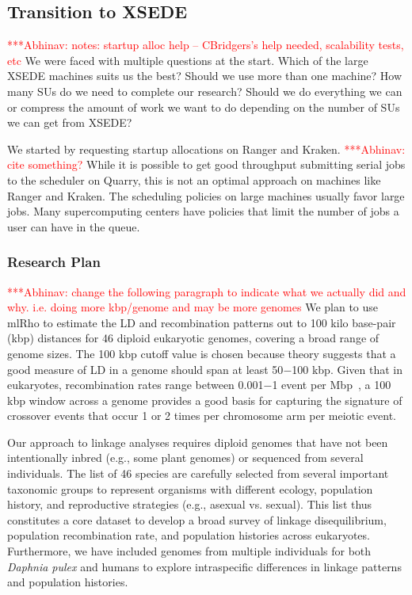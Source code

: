 \documentclass{sig-alternate}
\newcommand{\abhi}[1]{ {\textcolor{red} { ***Abhinav: #1 }}}
\newcommand{\abhi}[1]{ {}}
\begin{document}
\subsection{Transition to XSEDE}
\abhi{notes: startup alloc help -- CBridgers's help needed, scalability tests, etc}
We were faced with multiple questions at the start. Which of the large XSEDE machines suits us the best? Should we use more than one machine? How many SUs do we need to complete our research? Should we do everything we can or compress the amount of work we want to do depending on the number of SUs we can get from XSEDE?

We started by requesting startup allocations on Ranger and Kraken.  \abhi{cite something?} While it is possible to get good throughput submitting serial jobs to the scheduler on Quarry, this is not an optimal approach on machines like Ranger and Kraken. The scheduling policies on large machines usually favor large jobs. Many supercomputing centers have policies that limit the number of jobs a user can have in the queue. 


\subsubsection{Research Plan}\label{sec:plan}

\abhi{change the following paragraph to indicate what we actually did and why. i.e. doing more kbp/genome and may be more genomes}
We plan to use mlRho to estimate the LD and recombination patterns out to 100 kilo base-pair (kbp) distances for 46 diploid eukaryotic genomes, covering a broad range of genome sizes.%
The 100 kbp cutoff value is chosen because theory suggests that a good measure
of LD in a genome should span at least 50$-$100 kbp. Given that in eukaryotes, recombination rates range
between 0.001$-$1 event per Mbp~\cite{annurev-genom-082410-101412}, a 100 kbp window across a genome provides
a good basis for capturing the signature of crossover events that occur 1 or 2 times per chromosome arm per
meiotic event.

Our approach to linkage analyses requires diploid genomes that have not been intentionally inbred  (e.g., some plant genomes) or sequenced from several individuals. The list of 46 species are carefully selected from several important taxonomic groups to represent organisms with different ecology, population history, and reproductive strategies  (e.g., asexual vs. sexual). This list  thus constitutes a core dataset to develop a broad survey of linkage disequilibrium, population recombination rate, and population histories across eukaryotes. Furthermore, we have included genomes from multiple individuals for both {\it Daphnia pulex} and humans to explore intraspecific differences in linkage patterns and population histories. 
\end{document}
